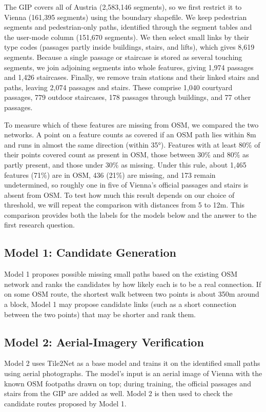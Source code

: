 \documentclass[conference]{IEEEtran}
\begin{document}
The GIP covers all of Austria (2,583,146 segments), so we first restrict it to Vienna (161,395 segments) using the boundary shapefile. We keep pedestrian segments and pedestrian-only paths, identified through the segment tables and the user-mode column (151,670 segments). We then select small links by their type codes (passages partly inside buildings, stairs, and lifts), which gives 8,619 segments. Because a single passage or staircase is stored as several touching segments, we join adjoining segments into whole features, giving 1,974 passages and 1,426 staircases. Finally, we remove train stations and their linked stairs and paths, leaving 2,074 passages and stairs. These comprise 1,040 courtyard passages, 779 outdoor staircases, 178 passages through buildings, and 77 other passages.

To measure which of these features are missing from OSM, we compared the two networks. A point on a feature counts as covered if an OSM path lies within 8m and runs in almost the same direction (within 35°). Features with at least 80\% of their points covered count as present in OSM, those between 30\% and 80\% as partly present, and those under 30\% as missing. Under this rule, about 1,465 features (71\%) are in OSM, 436 (21\%) are missing, and 173 remain undetermined, so roughly one in five of Vienna's official passages and stairs is absent from OSM. To test how much this result depends on our choice of threshold, we will repeat the comparison with distances from 5 to 12m. This comparison provides both the labels for the models below and the answer to the first research question.

\subsection{Model 1: Candidate Generation}

Model 1 proposes possible missing small paths based on the existing OSM network and ranks the candidates by how likely each is to be a real connection. If on some OSM route, the shortest walk between two points is about 350m around a block, Model 1 may propose candidate links (such as a short connection between the two points) that may be shorter and rank them. 

\subsection{Model 2: Aerial-Imagery Verification}

Model 2 uses Tile2Net \cite{hosseini2023} as a base model and trains it on the identified small paths using aerial photographs. The model's input is an aerial image of Vienna with the known OSM footpaths drawn on top; during training, the official passages and stairs from the GIP are added as well. Model 2 is then used to check the candidate routes proposed by Model 1. 
\end{document}
